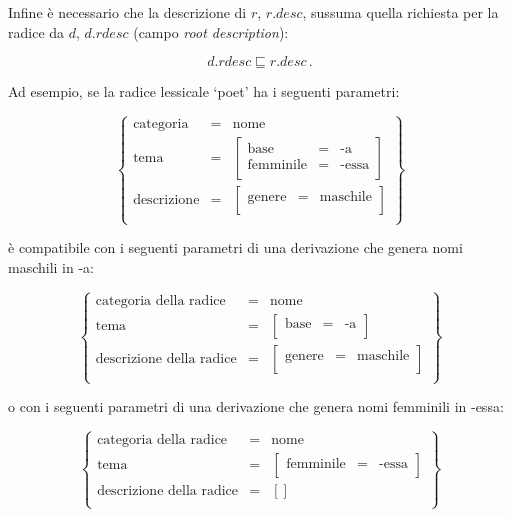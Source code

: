 \documentclass[twoside,stylearticle,11pt,filologia,it,article,bibsection]{spinoza}
\newcommand\spzradless[1]{#1\hspace{.2mm}{\scriptsize $\vdash$}}
\newcommand\spzmsussunto{\sqsubseteq}
\newenvironment{lingmeq}{\begin{lingeq}\[}{\]\end{lingeq}}
\begin{document}
Infine è necessario che la descrizione di $r$, $r.desc$, sussuma
quella richiesta per la radice da $d$, $d.{rdesc}$ (campo {\it root
  description}):
\begin{lingmeq}
d.{rdesc}\spzmsussunto r.desc\,. 
\end{lingmeq}

Ad esempio, se la radice lessicale `\spzradless{poet}' ha i seguenti parametri:
\begin{lingmeq}
\left\{\begin{array}{lll}
\text{categoria} & = & \text{nome} \\
\text{tema} & = &
\left[\begin{array}{lll}
\text{base}&=&\text{-a}\\
\text{femminile}&=&\text{-essa}\\
\end{array}\right]\\
\text{descrizione} & = &
\left[\begin{array}{lll}
\text{genere}&=&\text{maschile}\\
\end{array}\right]\\
\end{array}\right\}
\end{lingmeq}
\noindent è compatibile con i seguenti parametri di una
derivazione che genera nomi maschili in -a:
\begin{lingmeq}
\left\{\begin{array}{lll}
\text{categoria della radice} & = & \text{nome} \\
\text{tema} & = &
\left[\begin{array}{lll}
\text{base}&=&\text{-a}\\
\end{array}\right]\\
\text{descrizione della radice} & = &
\left[\begin{array}{lll}
\text{genere}&=&\text{maschile}\\
\end{array}\right]\\
\end{array}\right\}
\end{lingmeq}
\noindent o con i seguenti parametri di una
derivazione che genera nomi femminili in -essa:
\begin{lingmeq}
\left\{\begin{array}{lll}
\text{categoria della radice} & = & \text{nome} \\
\text{tema} & = &
\left[\begin{array}{lll}
\text{femminile}&=&\text{-essa}\\
\end{array}\right]\\
\text{descrizione della radice} & = & [] \\
\end{array}\right\}
\end{lingmeq}
\end{document}
